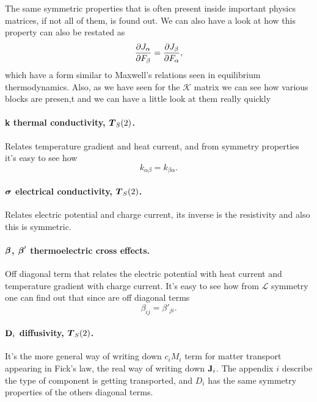 \noindent
The same symmetric properties that is often present inside important physics matrices, if not all of them, is found out. We can also have a look at how this property can also be restated as
\begin{equation}
    \pdv{J_\alpha}{F_\beta} = \pdv{J_\beta}{F_\alpha},
\end{equation} 
which have a form similar to Maxwell's relations seen in equilibrium thermodynamics. Also, as we have seen for the $\mathcal{K}$ matrix we can see how various blocks are presen,t and we can have a little look at them really quickly

\paragraph{\bf k thermal conductivity, $\vb*{T}_S(2)$.} Relates temperature gradient and heat current, and from symmetry properties it's easy to see how
\begin{equation}
    k_{\alpha\beta} = k_{\beta\alpha}.
\end{equation}

\paragraph{$\vb*{\sigma}$ \bf electrical conductivity, $\vb*{T}_S(2)$.} Relates electric potential and charge current, its inverse is the resistivity and also this is symmetric.

\paragraph{$\vb*{\beta}$, $\vb*{\beta}'$ \bf thermoelectric cross effects.} Off diagonal term that relates the electric potential with heat current and temperature gradient with charge current. It's easy to see how from $\mathcal{L}$ symmetry one can find out that since are off diagonal terms
\begin{equation}
    \label{eq:ThermoeTensorProp}
    \beta_{ij} = \beta'_{ji}.
\end{equation}

\paragraph{\bf $\vb{D}_i$ diffusivity, $\vb*{T}_S(2)$.} It's the more general way of writing down $c_i M_i$ term for matter transport appearing in Fick's law, the real way of writing down $\vb{J}_i$. The appendix $i$ describe the type of component is getting transported, and $D_i$ has the same symmetry properties of the others diagonal terms.

